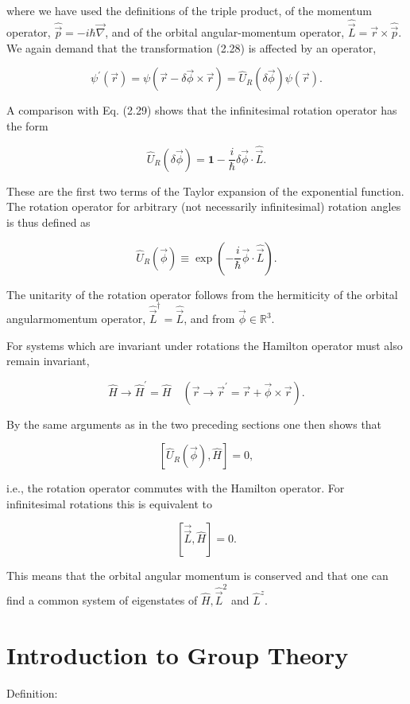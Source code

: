 \documentclass[10pt, letterpaper]{article}
\begin{document}
where we have used the definitions of the triple product, of the momentum operator, $\hat{\vec{p}}=-i \hbar \vec{\nabla}$, and of the orbital angular-momentum operator, $\hat{\vec{L}}=\vec{r} \times \hat{\vec{p}}$. We again demand that the transformation (2.28) is affected by an operator,

$$
\psi^{\prime}(\vec{r})=\psi(\vec{r}-\delta \vec{\phi} \times \vec{r})=\hat{U}_{R}(\delta \vec{\phi}) \psi(\vec{r}) .
$$

A comparison with Eq. (2.29) shows that the infinitesimal rotation operator has the form

$$
\hat{U}_{R}(\delta \vec{\phi})=\mathbf{1}-\frac{i}{\hbar} \delta \vec{\phi} \cdot \hat{\vec{L}} .
$$

These are the first two terms of the Taylor expansion of the exponential function. The rotation operator for arbitrary (not necessarily infinitesimal) rotation angles is thus defined as

$$
\hat{U}_{R}(\vec{\phi}) \equiv \exp \left(-\frac{i}{\hbar} \vec{\phi} \cdot \hat{\vec{L}}\right) .
$$

The unitarity of the rotation operator follows from the hermiticity of the orbital angularmomentum operator, $\hat{\vec{L}}^{\dagger}=\hat{\vec{L}}$, and from $\vec{\phi} \in \mathbb{R}^{3}$.

For systems which are invariant under rotations the Hamilton operator must also remain invariant,

$$
\hat{H} \longrightarrow \hat{H}^{\prime}=\hat{H} \quad\left(\vec{r} \longrightarrow \vec{r}^{\prime}=\vec{r}+\vec{\phi} \times \vec{r}\right) .
$$

By the same arguments as in the two preceding sections one then shows that

$$
\left[\hat{U}_{R}(\vec{\phi}), \hat{H}\right]=0,
$$

i.e., the rotation operator commutes with the Hamilton operator. For infinitesimal rotations this is equivalent to

$$
[\overrightarrow{\vec{L}}, \hat{H}]=0 .
$$

This means that the orbital angular momentum is conserved and that one can find a common system of eigenstates of $\hat{H}, \hat{\vec{L}}^{2}$ and $\hat{L}^{z}$.




\section{Introduction to Group Theory}
Definition: 
\end{document}
